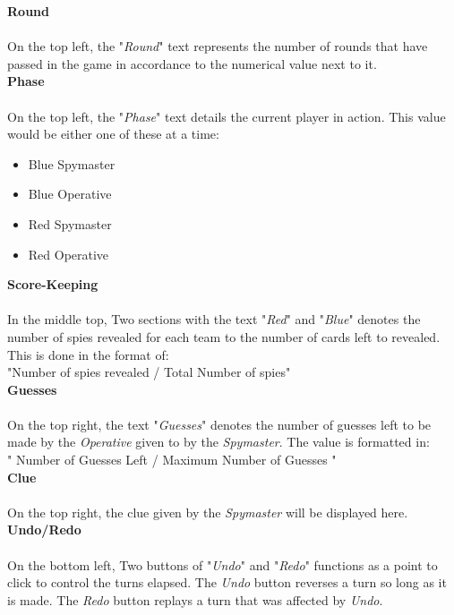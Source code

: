 \documentclass[10pt, a4paper]{article}
\begin{document}
	    \textbf{Round}\\
	    \\
	    On the top left, the "\textit{Round}" text represents the number of rounds that have passed in the game in accordance to the numerical value next to it.\\
	    
	    \textbf{Phase}\\
	    \\
	    On the top left, the "\textit{Phase}" text details the current player in action. This value would be either one of these at a time:
	        \begin{itemize}
	            \item Blue Spymaster
	            \item Blue Operative
	            \item Red Spymaster
	            \item Red Operative
	        \end{itemize}
	   
	   \textbf{Score-Keeping}\\
	   \\
	   In the middle top, Two sections with the text "\textit{Red}" and "\textit{Blue}" denotes the number of spies revealed for each team to the number of cards left to revealed. This is done in the format of:\\
	   
	   "Number of spies revealed / Total Number of spies"\\
	   
	   \textbf{Guesses}\\
	   \\
	    On the top right, the text "\textit{Guesses}" denotes the number of guesses left to be made by the \textit{Operative} given to by the \textit{Spymaster}. The value is formatted in: \\
	    
	   " Number of Guesses Left / Maximum Number of Guesses "\\
	   
	   \textbf{Clue}\\
	   \\
	   On the top right, the clue given by the \textit{Spymaster} will be displayed here.\\
	   
	   \textbf{Undo/Redo}\\
	   \\
	   On the bottom left, Two buttons of "\textit{Undo}" and "\textit{Redo}" functions as a point to click to control the turns elapsed. The \textit{Undo} button reverses a turn so long as it is made. The \textit{Redo} button replays a turn that was affected by \textit{Undo}.\\
	   
\end{document}
